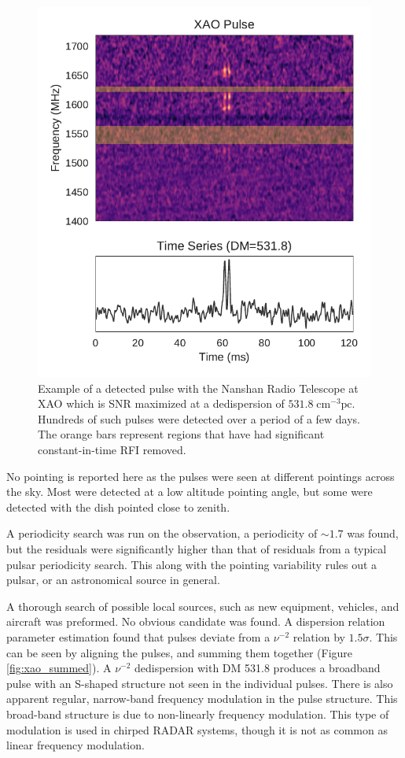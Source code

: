 \documentclass[a4paper,fleqn,usenatbib]{mnras}
\begin{document}
\begin{figure}
    \includegraphics[width=1.0\linewidth]{figures/XAO_pulse_dynamic.pdf}
    \caption{Example of a detected pulse with the Nanshan Radio Telescope at XAO
    which is SNR maximized at a dedispersion of $531.8 \; \textrm{cm}^{-3}
    \textrm{pc}$. Hundreds of such pulses were detected over a period of a few
    days. The orange bars represent regions that have had significant
    constant-in-time RFI removed.
    }
    \label{fig:xao_dynamic}
\end{figure}

No pointing is reported here as the pulses were seen at different pointings
across the sky. Most were detected at a low altitude pointing angle, but some
were detected with the dish pointed close to zenith.

A periodicity search was run on the observation, a periodicity of $\sim 1.7$ was
found, but the residuals were significantly higher than that of residuals from a
typical pulsar periodicity search. This along with the pointing variability
rules out a pulsar, or an astronomical source in general.

A thorough search of possible local sources, such as new equipment, vehicles,
and aircraft was preformed. No obvious candidate was found. A dispersion
relation parameter estimation found that pulses deviate from a $\nu^{-2}$
relation by $1.5 \sigma$. This can be seen by aligning the pulses, and summing
them together (Figure \ref{fig:xao_summed}). A $\nu^{-2}$ dedispersion with DM
531.8 produces a broadband pulse with an S-shaped structure not seen in the
individual pulses. There is also apparent regular, narrow-band frequency
modulation in the pulse structure. This broad-band structure is due to
non-linearly frequency modulation. This type of modulation is used in chirped
RADAR systems, though it is not as common as linear frequency modulation.
\end{document}
